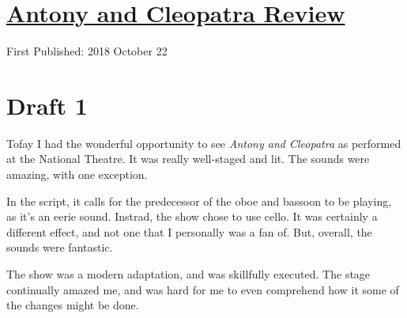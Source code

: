 \documentclass[12pt]{article}[titlepage]
\newcommand{\1}{\={a}}
\newcommand{\2}{\={e}}
\newcommand{\3}{\={\i}}
\newcommand{\4}{\=o}
\newcommand{\5}{\=u}
\newcommand{\6}{\={A}}
\renewcommand{\,}{\textsuperscript{,}}
\begin{document}
\doublespacing
\section{\href{antony-and-cleopatra.html}{Antony and Cleopatra Review}}
First Published: 2018 October 22
\section{Draft 1}
Tofay I had the wonderful opportunity to see \textit{Antony and Cleopatra} as performed at the National Theatre.
It was really well-staged and lit.
The sounds were amazing, with one exception.

In the script, it calls for the predecessor of the oboe and bassoon to be playing, as it's an eerie sound.
Instrad, the show chose to use cello.
It was certainly a different effect, and not one that I personally was a fan of.
But, overall, the sounds were fantastic.

The show was a modern adaptation, and was skillfully executed.
The stage continually amazed me, and was hard for me to even comprehend how it some of the changes might be done.
\end{document}
